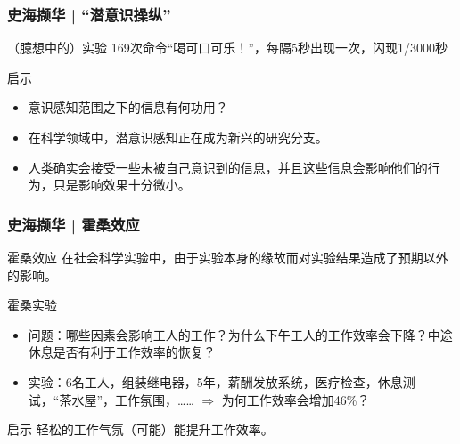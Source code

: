 \begin{frame}
  \frametitle{史海撷华 | “潜意识操纵”}
  \begin{block}{（臆想中的）实验}
    169次命令“喝可口可乐！”，每隔5秒出现一次，闪现1/3000秒
  \end{block}
  \pause
  \begin{block}{启示}
    \begin{itemize}
      \item 意识感知范围之下的信息有何功用？
      \item 在科学领域中，\alert{潜意识感知正在成为新兴的研究分支}。
      \item 人类确实会接受一些未被自己意识到的信息，并且这些信息会影响他们的行为，只是影响效果十分微小。
    \end{itemize}
  \end{block}
\end{frame}

\begin{frame}
  \frametitle{史海撷华 | 霍桑效应}
  \begin{block}{霍桑效应}
    在社会科学实验中，由于实验本身的缘故而对实验结果造成了预期以外的影响。
  \end{block}
  \pause
  \begin{block}{霍桑实验}
    \begin{itemize}
      \item 问题：哪些因素会影响工人的工作？为什么下午工人的工作效率会下降？中途休息是否有利于工作效率的恢复？
      \item 实验：6名工人，组装继电器，5年，薪酬发放系统，医疗检查，休息测试，“茶水屋”，工作氛围，…… $\Longrightarrow$ 为何工作效率会增加46\%？
    \end{itemize}
  \end{block}
  \pause
  \begin{block}{启示}
    轻松的工作气氛（可能）能提升工作效率。
  \end{block}
\end{frame}

